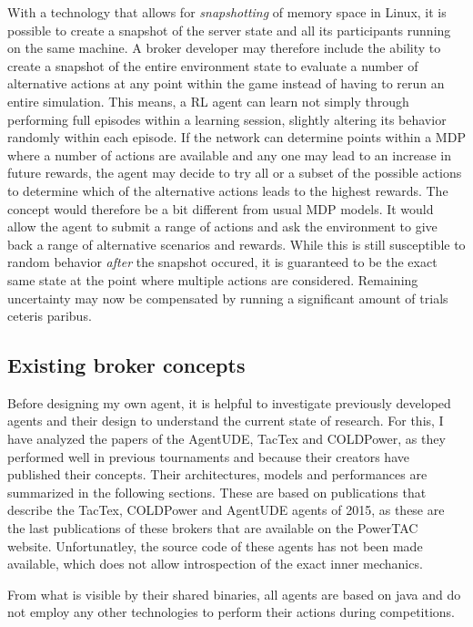 With a technology that allows for \emph{snapshotting} of memory space in Linux, it is possible to create a snapshot of
the server state and all its participants running on the same machine. A broker developer may therefore include the
ability to create a snapshot of the entire environment state to evaluate a number of alternative actions at any point
within the game instead of having to rerun an entire simulation. This means, a \ac{RL} agent can learn not simply
through performing full episodes within a learning session, slightly altering its behavior randomly within each episode.
If the network can determine points within a \ac{MDP} where a number of actions are available and any one may lead to an
increase in future rewards, the agent may decide to try all or a subset of the possible actions to determine which of
the alternative actions leads to the highest rewards. The concept would therefore be a bit different from usual \ac{MDP}
models. It would allow the agent to submit a range of actions and ask the environment to give back a range of
alternative scenarios and rewards. While this is still susceptible to random behavior \emph{after} the snapshot occured,
it is guaranteed to be the exact same state at the point where multiple actions are considered. Remaining uncertainty
may now be compensated by running a significant amount of trials ceteris paribus.




\subsection{Existing broker concepts}%
\label{sub:existing_broker_concepts}
Before designing my own agent, it is helpful to investigate previously developed agents and their design to understand
the current state of research. For this, I have analyzed the papers of the AgentUDE, TacTex and COLDPower, as they
performed well in previous tournaments and because their creators have published their concepts. Their architectures,
models and performances are summarized in the following sections. These are based on publications that describe the
TacTex, COLDPower and AgentUDE agents of 2015, as these are the last publications of these brokers that are available on
the \ac {PowerTAC} website. Unfortunatley, the source code of these agents has not been made available, which does not
allow introspection of the exact inner mechanics. 

From what is visible by their shared binaries, all agents are based on java and do not employ any other technologies to
perform their actions during competitions. 


